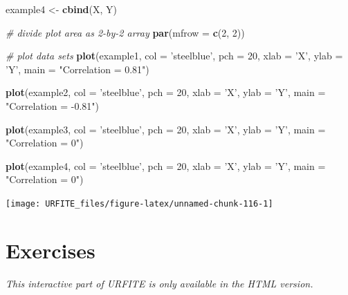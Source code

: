 \documentclass[]{book}
\newenvironment{Shaded}{\begin{snugshade}}{\end{snugshade}}
\newcommand{\KeywordTok}[1]{\textcolor[rgb]{0.13,0.29,0.53}{\textbf{#1}}}
\newcommand{\DataTypeTok}[1]{\textcolor[rgb]{0.13,0.29,0.53}{#1}}
\newcommand{\DecValTok}[1]{\textcolor[rgb]{0.00,0.00,0.81}{#1}}
\newcommand{\StringTok}[1]{\textcolor[rgb]{0.31,0.60,0.02}{#1}}
\newcommand{\CommentTok}[1]{\textcolor[rgb]{0.56,0.35,0.01}{\textit{#1}}}
\newcommand{\NormalTok}[1]{#1}
\theoremstyle{definition}
\theoremstyle{definition}
\theoremstyle{definition}
\theoremstyle{remark}
\begin{document}
\begin{Shaded}
\begin{Highlighting}[]
\NormalTok{example4 <-}\StringTok{ }\KeywordTok{cbind}\NormalTok{(X, Y)}

\CommentTok{# divide plot area as 2-by-2 array}
\KeywordTok{par}\NormalTok{(}\DataTypeTok{mfrow =} \KeywordTok{c}\NormalTok{(}\DecValTok{2}\NormalTok{, }\DecValTok{2}\NormalTok{))}

\CommentTok{# plot data sets}
\KeywordTok{plot}\NormalTok{(example1, }\DataTypeTok{col =} \StringTok{'steelblue'}\NormalTok{, }\DataTypeTok{pch =} \DecValTok{20}\NormalTok{, }\DataTypeTok{xlab =} \StringTok{'X'}\NormalTok{, }\DataTypeTok{ylab =} \StringTok{'Y'}\NormalTok{, }
     \DataTypeTok{main =} \StringTok{"Correlation = 0.81"}\NormalTok{)}

\KeywordTok{plot}\NormalTok{(example2, }\DataTypeTok{col =} \StringTok{'steelblue'}\NormalTok{, }\DataTypeTok{pch =} \DecValTok{20}\NormalTok{, }\DataTypeTok{xlab =} \StringTok{'X'}\NormalTok{, }\DataTypeTok{ylab =} \StringTok{'Y'}\NormalTok{, }
     \DataTypeTok{main =} \StringTok{"Correlation = -0.81"}\NormalTok{)}

\KeywordTok{plot}\NormalTok{(example3, }\DataTypeTok{col =} \StringTok{'steelblue'}\NormalTok{, }\DataTypeTok{pch =} \DecValTok{20}\NormalTok{, }\DataTypeTok{xlab =} \StringTok{'X'}\NormalTok{, }\DataTypeTok{ylab =} \StringTok{'Y'}\NormalTok{, }
     \DataTypeTok{main =} \StringTok{"Correlation = 0"}\NormalTok{)}

\KeywordTok{plot}\NormalTok{(example4, }\DataTypeTok{col =} \StringTok{'steelblue'}\NormalTok{, }\DataTypeTok{pch =} \DecValTok{20}\NormalTok{, }\DataTypeTok{xlab =} \StringTok{'X'}\NormalTok{, }\DataTypeTok{ylab =} \StringTok{'Y'}\NormalTok{, }
     \DataTypeTok{main =} \StringTok{"Correlation = 0"}\NormalTok{)}
\end{Highlighting}
\end{Shaded}

\begin{center}\texttt{[image: URFITE\_files/figure-latex/unnamed-chunk-116-1]} \end{center}

\section{Exercises}\label{exercises-1}

\begin{center}\textit{This interactive part of URFITE is only available in the HTML version.}\end{center}


\end{document}
